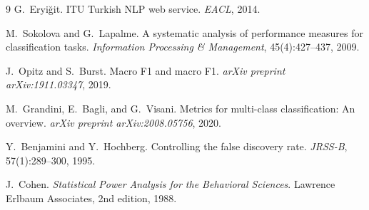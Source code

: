 \documentclass[11pt,a4paper]{article}
\begin{document}
\begin{thebibliography}{9}
G.~Eryi\u{g}it. ITU Turkish NLP web service. \emph{EACL}, 2014.

M.~Sokolova and G.~Lapalme. A systematic analysis of performance
measures for classification tasks. \emph{Information Processing
\& Management}, 45(4):427--437, 2009.

J.~Opitz and S.~Burst. Macro F1 and macro F1. \emph{arXiv preprint
arXiv:1911.03347}, 2019.

M.~Grandini, E.~Bagli, and G.~Visani. Metrics for multi-class
classification: An overview. \emph{arXiv preprint arXiv:2008.05756}, 2020.

Y.~Benjamini and Y.~Hochberg. Controlling the false discovery rate.
\emph{JRSS-B}, 57(1):289--300, 1995.

J.~Cohen. \emph{Statistical Power Analysis for the Behavioral Sciences}.
Lawrence Erlbaum Associates, 2nd edition, 1988.

\end{thebibliography}
\end{document}
